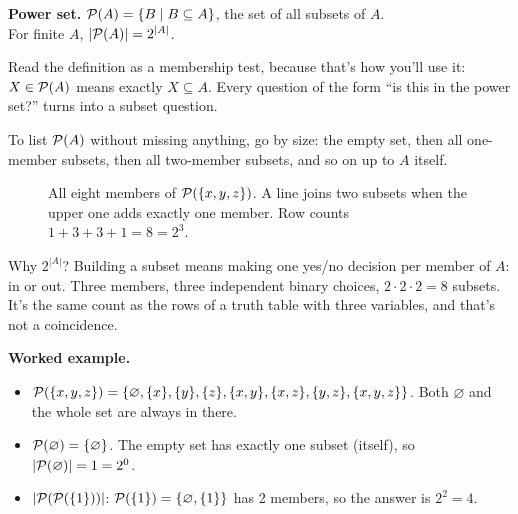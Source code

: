 \begin{notebox}
\textbf{Power set.} $\mathcal{P}(A)=\{B\mathrel{|} B\subseteq A\}$, the set of all subsets of $A$.\\
For finite $A$, $|\mathcal{P}(A)|=2^{|A|}$.
\end{notebox}

Read the definition as a membership test, because that's how you'll use it: $X\in\mathcal{P}(A)$ means exactly $X\subseteq A$. Every question of the form ``is this in the power set?'' turns into a subset question.

To list $\mathcal{P}(A)$ without missing anything, go by size: the empty set, then all one-member subsets, then all two-member subsets, and so on up to $A$ itself.

\begin{figure}[H]
\centering
{}
\caption{All eight members of $\mathcal{P}(\{x,y,z\})$. A line joins two subsets when the upper one adds exactly one member. Row counts $1+3+3+1=8=2^3$.}
\end{figure}

Why $2^{|A|}$? Building a subset means making one yes/no decision per member of $A$: in or out. Three members, three independent binary choices, $2\cdot2\cdot2=8$ subsets. It's the same count as the rows of a truth table with three variables, and that's not a coincidence.

\textbf{Worked example.}
\begin{itemize}
  \item $\mathcal{P}(\{x,y,z\})=\{\varnothing,\{x\},\{y\},\{z\},\{x,y\},\{x,z\},\{y,z\},\{x,y,z\}\}$. Both $\varnothing$ and the whole set are always in there.
  \item $\mathcal{P}(\varnothing)=\{\varnothing\}$. The empty set has exactly one subset (itself), so $|\mathcal{P}(\varnothing)|=1=2^0$.
  \item $|\mathcal{P}(\mathcal{P}(\{1\}))|$: $\mathcal{P}(\{1\})=\{\varnothing,\{1\}\}$ has 2 members, so the answer is $2^2=4$.
\end{itemize}

